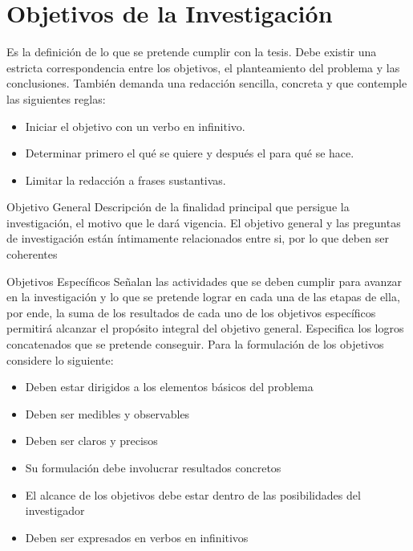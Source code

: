 \documentclass[12]{plan_tesis}
\begin{document}
\section{Objetivos de la Investigación}
Es la definición de lo que se pretende cumplir con la tesis. Debe existir una estricta correspondencia entre los objetivos, el planteamiento del problema y las conclusiones. También demanda una redacción sencilla, concreta y que contemple las siguientes reglas:

\begin{itemize}
    \item Iniciar el objetivo con un verbo en infinitivo.
    \item Determinar primero el qué se quiere y después el para qué se hace.
    \item Limitar la redacción a frases sustantivas.
\end{itemize}

\begin{subseccion}{Objetivo General}
Descripción de la finalidad principal que persigue la investigación, el motivo que le dará vigencia. El objetivo general y las preguntas de investigación están íntimamente relacionados entre si, por lo que deben ser coherentes
\end{subseccion}

\begin{subseccion}{Objetivos Específicos}
Señalan las actividades que se deben cumplir para avanzar en la investigación y lo que se pretende lograr en cada una de las etapas de ella, por ende, la suma de los resultados de cada uno de los objetivos específicos permitirá alcanzar el propósito integral del objetivo general. Especifica los logros concatenados que se pretende conseguir.
Para la formulación de los objetivos considere lo siguiente:

\begin{itemize}
    \item Deben estar dirigidos a los elementos básicos del problema
    \item Deben ser medibles y observables
    \item Deben ser claros y precisos
    \item Su formulación debe involucrar resultados concretos
    \item El alcance de los objetivos debe estar dentro de las posibilidades del investigador
    \item Deben ser expresados en verbos en infinitivos
\end{itemize}
\end{subseccion}
\end{document}
